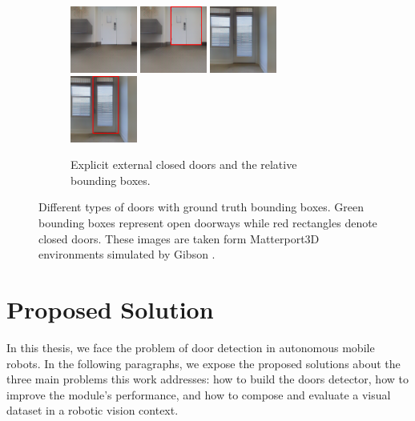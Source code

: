 \begin{figure}[h!]
	\begin{subfigure}[b]{\linewidth}
		\centering
		\includegraphics[width=0.24\textwidth]{images/explicitexternalclosed1.png}
		\hfill
		\includegraphics[width=0.24\textwidth]{images/explicitexternalclosed1boxed.png}
		\hfill
		\includegraphics[width=0.24\textwidth]{images/explicitexternalclosed2.png}
		\hfill
		\includegraphics[width=0.24\textwidth]{images/explicitexternalclosed2boxed.png}
		\caption{Explicit external closed doors and the relative bounding boxes.}
	\end{subfigure}
	\caption{Different types of doors with ground truth bounding boxes. Green bounding boxes represent open doorways while red rectangles denote closed doors. These images are taken form Matterport3D \cite{matterport} environments simulated by Gibson \cite{gibson}.}
\end{figure}

\section{Proposed Solution}
\label{sec:solution}
In this thesis, we face the problem of door detection in autonomous mobile robots. In the following paragraphs, we expose the proposed solutions about the three main problems this work addresses: how to build the doors detector, how to improve the module's performance, and how to compose and evaluate a visual dataset in a robotic vision context.


